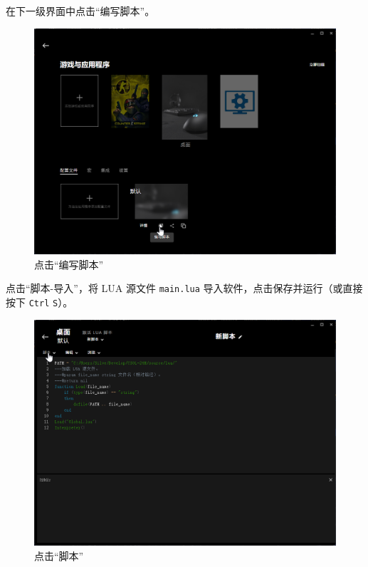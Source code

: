 在下一级界面中点击“编写脚本”。

\begin{figure}[H]
    \Centering
    \includegraphics[width=\textwidth]{docs/assets/script.png}
    \caption{点击“编写脚本”}
\end{figure}

点击“脚本-导入”，将 LUA 源文件 \lstinline{main.lua} 导入软件，点击保存并运行（或直接按下 \lstinline{Ctrl} \lstinline{S}）。

\begin{figure}[H]
    \Centering
    \includegraphics[width=\textwidth]{docs/assets/edit.png}
    \caption{点击“脚本”}
\end{figure}

